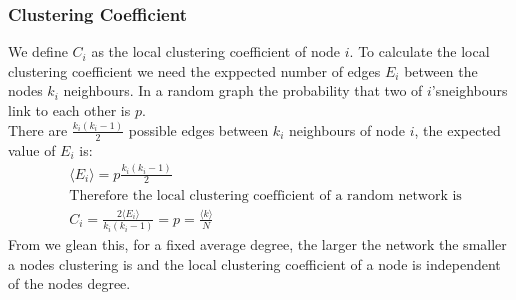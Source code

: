 \documentclass{article}
\begin{document}
            \subsubsection{Clustering Coefficient}
            We define $C_i$ as the local clustering coefficient of node $i$. To calculate the local clustering coefficient we need the exppected number of edges $E_i$ between the nodes $k_i$ neighbours. In a random graph the probability that two of $i$'sneighbours link to each other is $p$.\\ There are $\frac{k_{i}(k_{i}-1)}{2}$ possible edges between $k_i$ neighbours of node $i$, the expected value of $E_i$ is:
            \begin{align*}
                &\langle E_i \rangle = p\frac{k_{i}(k_{i}-1)}{2}\\
                &\text{Therefore the local clustering coefficient of a random network is}\\
                &C_i = \frac{2\langle E_i \rangle}{k_{i}(k_{i}-1)} = p = \frac{\langle k \rangle}{N}
            \end{align*} 
            From we glean this, for a fixed average degree, the larger the network the smaller a nodes clustering is and the local clustering coefficient of a node is independent of the nodes degree.
\end{document}
